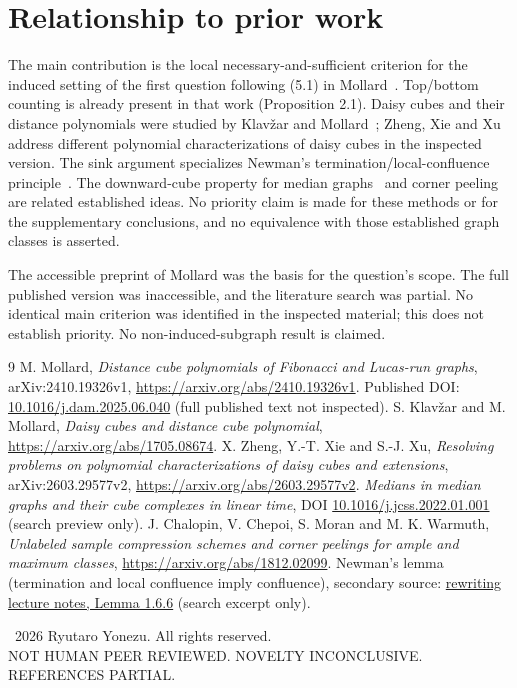 \documentclass[11pt,a4paper]{article}
\begin{document}
\section{Relationship to prior work}
The main contribution is the local necessary-and-sufficient criterion for the induced setting of the first question following (5.1) in Mollard~\cite{mollard}. Top/bottom counting is already present in that work (Proposition 2.1). Daisy cubes and their distance polynomials were studied by Klav\v zar and Mollard~\cite{daisy}; Zheng, Xie and Xu~\cite{zheng} address different polynomial characterizations of daisy cubes in the inspected version.
The sink argument specializes Newman's termination/local-confluence principle~\cite{newman}. The downward-cube property for median graphs~\cite{median} and corner peeling~\cite{corner} are related established ideas. No priority claim is made for these methods or for the supplementary conclusions, and no equivalence with those established graph classes is asserted.

The accessible preprint of Mollard was the basis for the question's scope. The full published version was inaccessible, and the literature search was partial. No identical main criterion was identified in the inspected material; this does not establish priority. No non-induced-subgraph result is claimed.
\begin{thebibliography}{9}\small
{} M. Mollard, \emph{Distance cube polynomials of Fibonacci and Lucas-run graphs}, arXiv:2410.19326v1, \url{https://arxiv.org/abs/2410.19326v1}. Published DOI: \href{https://doi.org/10.1016/j.dam.2025.06.040}{10.1016/j.dam.2025.06.040} (full published text not inspected).
 S. Klav\v zar and M. Mollard, \emph{Daisy cubes and distance cube polynomial}, \url{https://arxiv.org/abs/1705.08674}.
 X. Zheng, Y.-T. Xie and S.-J. Xu, \emph{Resolving problems on polynomial characterizations of daisy cubes and extensions}, arXiv:2603.29577v2, \url{https://arxiv.org/abs/2603.29577v2}.
 \emph{Medians in median graphs and their cube complexes in linear time}, DOI \href{https://doi.org/10.1016/j.jcss.2022.01.001}{10.1016/j.jcss.2022.01.001} (search preview only).
 J. Chalopin, V. Chepoi, S. Moran and M. K. Warmuth, \emph{Unlabeled sample compression schemes and corner peelings for ample and maximum classes}, \url{https://arxiv.org/abs/1812.02099}.
 Newman's lemma (termination and local confluence imply confluence), secondary source: \href{https://www.mpi-inf.mpg.de/fileadmin/inf/rg1/Documents/script1-7-Errata-Sup.pdf}{rewriting lecture notes, Lemma 1.6.6} (search excerpt only).
\end{thebibliography}
\noindent\textcopyright\ 2026 Ryutaro Yonezu. All rights reserved.\\
\small NOT HUMAN PEER REVIEWED. NOVELTY INCONCLUSIVE. REFERENCES PARTIAL.
\end{document}
